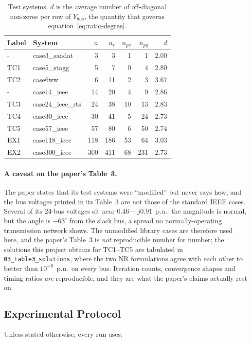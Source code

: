 \documentclass[sigconf,nonacm]{acmart}
\begin{document}
\begin{table}[t]
\centering
\caption{Test systems. $d$ is the average number of off-diagonal non-zeros per
row of $Y_{bus}$, the quantity that governs
equation~\eqref{eq:ratio-degree}.}
\label{tab:cases}
\small
\begin{tabular}{l l r r r r r}
\toprule
Label & System & $n$ & $n_\ell$ & $n_{pv}$ & $n_{pq}$ & $d$ \\
\midrule
-  & case3\_saadat     & 3   & 3   & 1  & 1   & 2.00 \\
TC1  & case5\_stagg      & 5   & 7   & 0  & 4   & 2.80 \\
TC2  & case6ww           & 6   & 11  & 2  & 3   & 3.67 \\
-  & case14\_ieee      & 14  & 20  & 4  & 9   & 2.86 \\
TC3  & case24\_ieee\_rts & 24  & 38  & 10 & 13  & 2.83 \\
TC4  & case30\_ieee      & 30  & 41  & 5  & 24  & 2.73 \\
TC5  & case57\_ieee      & 57  & 80  & 6  & 50  & 2.74 \\
EX1  & case118\_ieee     & 118 & 186 & 53 & 64  & 3.03 \\
EX2  & case300\_ieee     & 300 & 411 & 68 & 231 & 2.73 \\
\bottomrule
\end{tabular}
\end{table}

\paragraph{A caveat on the paper's Table~3.}
The paper states that its test systems were ``modified'' but never says how, and
the bus voltages printed in its Table~3 are not those of the standard IEEE
cases. Several of its 24-bus voltages sit near $0.46-j0.91$~p.u.: the magnitude
is normal, but the angle is $-63^\circ$ from the slack bus, a spread no
normally-operating transmission network shows. The unmodified library cases are
therefore used here, and the paper's Table~3 is \emph{not} reproducible number
for number; the solutions this project obtains for TC1--TC5 are tabulated in
\texttt{03\_table3\_solutions}, where the two NR formulations agree with each
other to better than $10^{-9}$~p.u.\ on every bus. Iteration counts, convergence
shapes and timing ratios \emph{are} reproducible, and they are what the paper's
claims actually rest on.

\subsection{Experimental Protocol}
\label{sec:protocol}
Unless stated otherwise, every run uses:
\end{document}
